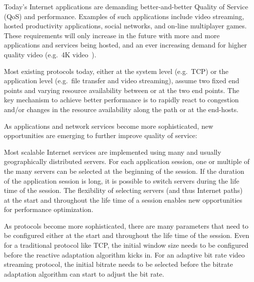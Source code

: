 \label{sec:intro}



Today's Internet applications are demanding better-and-better Quality of Service (QoS) and performance. Examples of such applications include video streaming, hosted productivity applications, social networks, and on-line multiplayer games. These requirements will only increase in the future with more and more applications and services being hosted, and an ever increasing demand for higher quality video (e.g.\ 4K video~\cite{4kvideo}).

Most existing protocols today, either at the system level (e.g.\ TCP) or the application level (e.g.\ file transfer and video streaming), assume two fixed end points and varying resource availability between or at the two end points.  The key mechanism to achieve better performance is to rapidly react to congestion and/or changes in the resource availability along the path or at the end-hosts. 

As applications and network services become more sophisticated, new opportunities are emerging to further improve quality of service: 

  Most scalable Internet services are implemented using many and usually geographically distributed servers.  For each application session, one or multiple of the many servers can be selected at the beginning of the session.  If the duration of the application session is long, it is possible to switch servers during the life time of the session. The flexibility of selecting servers (and thus Internet paths) at the start and throughout the life time of a session enables new opportunities for performance optimization. 

 As protocols become more sophisticated, there are many parameters that need to be configured either at the start and throughout the life time of the session. Even for a traditional protocol like TCP, the initial window size needs to be configured before the reactive adaptation algorithm kicks in. For an adaptive bit rate video streaming protocol, the initial bitrate needs to be selected before the bitrate adaptation algorithm can start to adjust the bit rate. 

